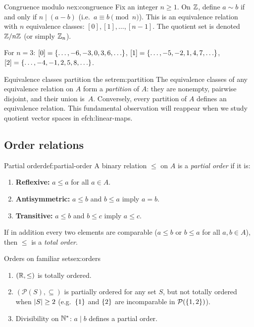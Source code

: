 \begin{example}{Congruence modulo $n$}{ex:congruence}
Fix an integer $n\geq 1$. On ${\mathbb{Z}}$, define $a\sim b$ if and only if
$n\mid (a-b)$ (i.e.\ $a\equiv b\pmod{n}$). This is an equivalence
relation with $n$ equivalence classes: $[0],[1],\ldots,[n-1]$. The
quotient set is denoted ${\mathbb{Z}}/n{\mathbb{Z}}$ (or simply ${\mathbb{Z}}_n$).

For $n=3$: $[0]=\left\{\ldots,-6,-3,0,3,6,\ldots\right\}$,
$[1]=\left\{\ldots,-5,-2,1,4,7,\ldots\right\}$,
$[2]=\left\{\ldots,-4,-1,2,5,8,\ldots\right\}$.
\end{example}

\begin{remark}{Equivalence classes partition the set}{rem:partition}
The equivalence classes of any equivalence relation on $A$ form a
\emph{partition} of $A$: they are nonempty, pairwise disjoint, and their
union is~$A$. Conversely, every partition of $A$ defines an equivalence
relation. This fundamental observation will reappear when we study quotient
vector spaces in 
ef{ch:linear-maps}.
\end{remark}

\subsection{Order relations}\label{subsec:order}

\begin{definition}{Partial order}{def:partial-order}
A binary relation $\leq$ on $A$ is a \emph{partial
order} if it is:
\begin{enumerate}[label=(\roman*)]
  \item \textbf{Reflexive:} $a\leq a$ for all $a\in A$.
  \item \textbf{Antisymmetric:} $a\leq b$ and $b\leq a$ imply $a = b$.
  \item \textbf{Transitive:} $a\leq b$ and $b\leq c$ imply $a\leq c$.
\end{enumerate}
If in addition every two elements are comparable ($a\leq b$ or $b\leq a$
for all $a,b\in A$), then $\leq$ is a \emph{total order}.
\end{definition}

\begin{example}{Orders on familiar sets}{ex:orders}
\begin{enumerate}[label=(\alph*)]
  \item $({\mathbb{R}},\leq)$ is totally ordered.
  \item $(\mathcal{P}(S),\subseteq)$ is partially ordered for any set $S$,
    but not totally ordered when $\left|S\right|\geq 2$ (e.g.\ $\left\{1\right\}$ and
    $\left\{2\right\}$ are incomparable in $\mathcal{P}(\left\{1,2\right\})$).
  \item Divisibility on ${\mathbb{N}}^*$: $a\mid b$ defines a partial order.
\end{enumerate}
\end{example}


